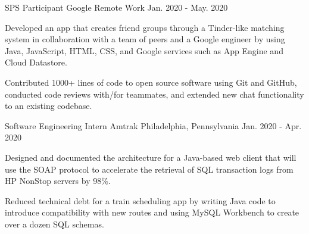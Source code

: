 

\begin{cventries}

  \cventry
    {SPS Participant} %
    {Google} %
    {Remote Work} %
    {Jan. 2020 - May. 2020} %
    {
      \begin{cvitems} %
        \item {Developed an app that creates friend groups through a Tinder-like matching system in collaboration with a team of peers and a Google engineer by using Java, JavaScript, HTML, CSS, and Google services such as App Engine and Cloud Datastore.}
        \item {Contributed 1000+ lines of code to open source software using Git and GitHub, conducted code reviews with/for teammates, and extended new chat functionality to an existing codebase.}
      \end{cvitems}
    }

  \cventry
    {Software Engineering Intern} %
    {Amtrak} %
    {Philadelphia, Pennsylvania} %
    {Jan. 2020 - Apr. 2020} %
    {
      \begin{cvitems} %
        \item {Designed and documented the architecture for a Java-based web client that will use the SOAP protocol to accelerate the retrieval of SQL transaction logs from HP NonStop servers by 98\%.}
        \item {Reduced technical debt for a train scheduling app by writing Java code to introduce compatibility with new routes and using MySQL Workbench to create over a dozen SQL schemas.}
      \end{cvitems}
    }


\end{cventries}
